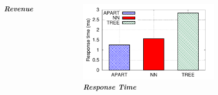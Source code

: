 \documentclass[t]{beamer}
\begin{document}
\begin{frame}
\begin{columns}
\begin{figure}
    \vspace{-0.08in}
    \small{\textit{\textbf{Revenue}}}
\end{figure}
\vspace{-0.1in}
\begin{figure}
	\centering
    \includegraphics[width = 0.95\columnwidth]{default_rp}
    \vspace{-0.08in}
    \small{\textit{\textbf{Response Time}}}
\end{figure}
\end{columns}
\end{frame}
\end{document}
